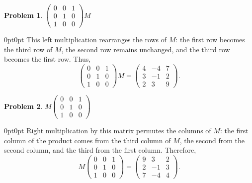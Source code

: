\documentclass[12pt]{article}
\newenvironment{answer}
    {\begin{adjustwidth}{0pt}{0pt}}
    {\end{adjustwidth}}
\newtheorem{problem}{Problem}
\theoremstyle{remark}  %
\begin{document}
\begin{problem}
$
\begin{pmatrix}
0 & 0 & 1 \\
0 & 1 & 0 \\
1 & 0 & 0
\end{pmatrix} M
$
\end{problem}
\begin{answer}
This left multiplication rearranges the rows of \(M\): the first row becomes the third row of \(M\), the second row remains unchanged, and the third row becomes the first row. Thus,
\[
\begin{pmatrix}
0 & 0 & 1 \\
0 & 1 & 0 \\
1 & 0 & 0
\end{pmatrix} M
=
\begin{pmatrix}
4 & -4 & 7 \\
3 & -1 & 2 \\
2 & 3 & 9
\end{pmatrix}.
\]
\end{answer}

\begin{problem}
$
M
\begin{pmatrix}
0 & 0 & 1 \\
0 & 1 & 0 \\
1 & 0 & 0
\end{pmatrix}
$
\end{problem}
\begin{answer}
Right multiplication by this matrix permutes the columns of \(M\): the first column of the product comes from the third column of \(M\), the second from the second column, and the third from the first column. Therefore,
\[
M \begin{pmatrix}
0 & 0 & 1 \\
0 & 1 & 0 \\
1 & 0 & 0
\end{pmatrix}
=
\begin{pmatrix}
9 & 3 & 2 \\
2 & -1 & 3 \\
7 & -4 & 4
\end{pmatrix}.
\]
\end{answer}
\end{document}
